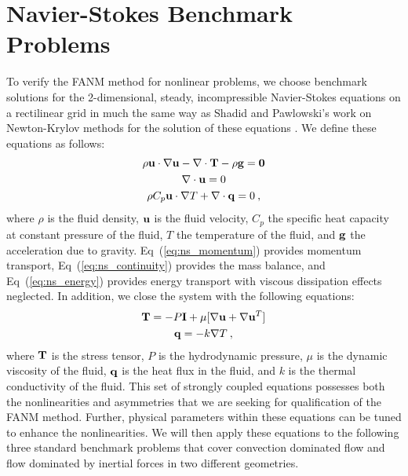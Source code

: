 \section{Navier-Stokes Benchmark Problems\ }
\label{sec:ns_benchmarks}
To verify the FANM method for nonlinear problems, we choose benchmark
solutions for the 2-dimensional, steady, incompressible Navier-Stokes
equations on a rectilinear grid in much the same way as Shadid and
Pawlowski's work on Newton-Krylov methods for the solution of these
equations \cite{shadid_inexact_1997,pawlowski_globalization_2006}. We
define these equations as follows:
\begin{subequations}
  \begin{gather}
    \rho \mathbf{u} \cdot \nabla \mathbf{u} - \nabla \cdot \mathbf{T} - \rho
    \mathbf{g} = \mathbf{0}
    \label{eq:ns_momentum}\\
    \nabla \cdot \mathbf{u} = 0
    \label{eq:ns_continuity}\\
    \rho C_p \mathbf{u} \cdot \nabla T + \nabla \cdot \mathbf{q} = 0\:,
    \label{eq:ns_energy}
  \end{gather}
  \label{eq:navier_stokes}
\end{subequations}
where $\rho$ is the fluid density, $\mathbf{u}$ is the fluid velocity,
$C_p$ the specific heat capacity at constant pressure of the fluid,
$T$ the temperature of the fluid, and $\mathbf{g}$ the acceleration due to
gravity. Eq~(\ref{eq:ns_momentum}) provides momentum transport,
Eq~(\ref{eq:ns_continuity}) provides the mass balance, and
Eq~(\ref{eq:ns_energy}) provides energy transport with viscous
dissipation effects neglected. In addition, we close the system with
the following equations:
\begin{subequations}
  \begin{gather}
    \mathbf{T} = -P \mathbf{I} + \mu[\nabla \mathbf{u} + \nabla \mathbf{u}^T]
    \label{eq:ns_stress_tensor}\\
    \mathbf{q} = - k \nabla T\:,
    \label{eq:ns_heat_flux}
  \end{gather}
  \label{eq:ns_closure}
\end{subequations}
where $\mathbf{T}$ is the stress tensor, $P$ is the hydrodynamic pressure,
$\mu$ is the dynamic viscosity of the fluid, $\mathbf{q}$ is the heat flux
in the fluid, and $k$ is the thermal conductivity of the fluid. This
set of strongly coupled equations possesses both the nonlinearities
and asymmetries that we are seeking for qualification of the FANM
method. Further, physical parameters within these equations can be
tuned to enhance the nonlinearities. We will then apply these
equations to the following three standard benchmark problems that
cover convection dominated flow and flow dominated by inertial
forces in two different geometries.

